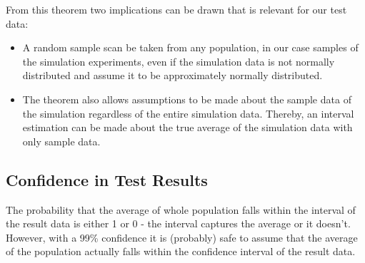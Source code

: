 \documentclass[a4paper,11pt]{kth-mag}
\begin{document}
From this theorem two implications can be drawn that is relevant for our test data:
\begin{itemize}
\item A random sample scan be taken from any population, in our case samples of the simulation experiments, even if the simulation data is not normally distributed and assume it to be approximately normally distributed.

\item The theorem also allows assumptions to be made about the sample data of the simulation regardless of the entire simulation data. Thereby, an interval estimation can be made about the true average of the simulation data with only sample data.
\end{itemize}

 \subsection{Confidence in Test Results}
The probability that the average of whole population falls within the interval of the result data is either 1 or 0 - the interval captures the average or it doesn't\cite{gunnar}. However, with a 99\% confidence it is (probably) safe to assume that the average of the population actually falls within the confidence interval of the result data. 


\begin{comment}
\begin{figure}[ht] 
\begin{center}
And here is a figure 
\caption{\small{Several statements describing the same resource.}}\label{RDF_4}
\end{center}
\end{figure}


that we refer to here: \ref{RDF_4}
\end{comment}
\printbibliography
\end{document}
